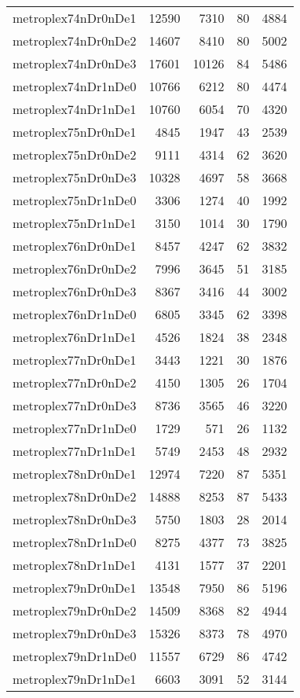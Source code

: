 \begin{longtable}{lrrrr}
metroplex74nDr0nDe1 & 12590 & 7310 & 80 & 4884 \\
metroplex74nDr0nDe2 & 14607 & 8410 & 80 & 5002 \\
metroplex74nDr0nDe3 & 17601 & 10126 & 84 & 5486 \\
metroplex74nDr1nDe0 & 10766 & 6212 & 80 & 4474 \\
metroplex74nDr1nDe1 & 10760 & 6054 & 70 & 4320 \\
metroplex75nDr0nDe1 & 4845 & 1947 & 43 & 2539 \\
metroplex75nDr0nDe2 & 9111 & 4314 & 62 & 3620 \\
metroplex75nDr0nDe3 & 10328 & 4697 & 58 & 3668 \\
metroplex75nDr1nDe0 & 3306 & 1274 & 40 & 1992 \\
metroplex75nDr1nDe1 & 3150 & 1014 & 30 & 1790 \\
metroplex76nDr0nDe1 & 8457 & 4247 & 62 & 3832 \\
metroplex76nDr0nDe2 & 7996 & 3645 & 51 & 3185 \\
metroplex76nDr0nDe3 & 8367 & 3416 & 44 & 3002 \\
metroplex76nDr1nDe0 & 6805 & 3345 & 62 & 3398 \\
metroplex76nDr1nDe1 & 4526 & 1824 & 38 & 2348 \\
metroplex77nDr0nDe1 & 3443 & 1221 & 30 & 1876 \\
metroplex77nDr0nDe2 & 4150 & 1305 & 26 & 1704 \\
metroplex77nDr0nDe3 & 8736 & 3565 & 46 & 3220 \\
metroplex77nDr1nDe0 & 1729 & 571 & 26 & 1132 \\
metroplex77nDr1nDe1 & 5749 & 2453 & 48 & 2932 \\
metroplex78nDr0nDe1 & 12974 & 7220 & 87 & 5351 \\
metroplex78nDr0nDe2 & 14888 & 8253 & 87 & 5433 \\
metroplex78nDr0nDe3 & 5750 & 1803 & 28 & 2014 \\
metroplex78nDr1nDe0 & 8275 & 4377 & 73 & 3825 \\
metroplex78nDr1nDe1 & 4131 & 1577 & 37 & 2201 \\
metroplex79nDr0nDe1 & 13548 & 7950 & 86 & 5196 \\
metroplex79nDr0nDe2 & 14509 & 8368 & 82 & 4944 \\
metroplex79nDr0nDe3 & 15326 & 8373 & 78 & 4970 \\
metroplex79nDr1nDe0 & 11557 & 6729 & 86 & 4742 \\
metroplex79nDr1nDe1 & 6603 & 3091 & 52 & 3144 \\

\end{longtable}
